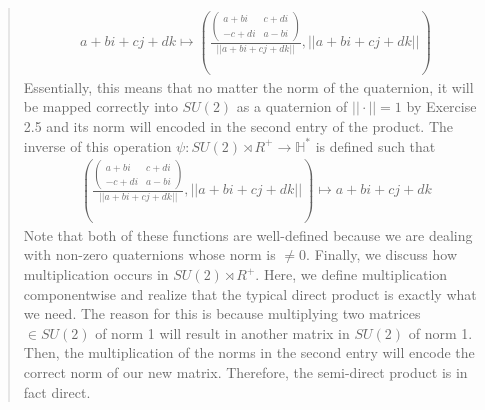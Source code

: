 \documentclass{article}
\begin{document}
\begin{enumerate}
\begin{quote}
            \begin{gather*}
                a + bi + cj + dk \mapsto (\frac{\begin{pmatrix}
                                            a + bi & c + di \\
                                            -c + di & a - bi
                                          \end{pmatrix}}{||a + bi + cj + dk||}, ||a + bi + cj + dk||)
            \end{gather*} Essentially, this means that no matter the norm of the quaternion, it will be mapped correctly into $SU(2)$ as a quaternion of $||\cdot|| = 1$
            by Exercise 2.5 and its norm will encoded in the second entry of the product. The inverse of this operation $\psi:SU(2) \rtimes R^+ \to \mathbb{H}^*$ is defined such that
            \begin{gather*}
                (\frac{\begin{pmatrix}
                    a + bi & c + di \\
                    -c + di & a - bi
                  \end{pmatrix}}{||a + bi + cj + dk||}, ||a + bi + cj + dk||) \mapsto a + bi + cj + dk 
            \end{gather*}
            Note that both of these functions are well-defined because we are dealing with non-zero quaternions whose norm is $\neq 0$. Finally, we discuss how multiplication occurs in $SU(2) \rtimes R^+$.
            Here, we define multiplication componentwise and realize that the typical direct product is exactly what we need. The reason for this is because multiplying two matrices $\in SU(2)$ of norm 1 
            will result in another matrix in $SU(2)$ of norm 1. Then, the multiplication of the norms in the second entry will encode the correct norm of our new matrix. Therefore, the semi-direct product is
            in fact direct. \qedsymbol
        \end{quote}
    \end{enumerate}
\end{document}
